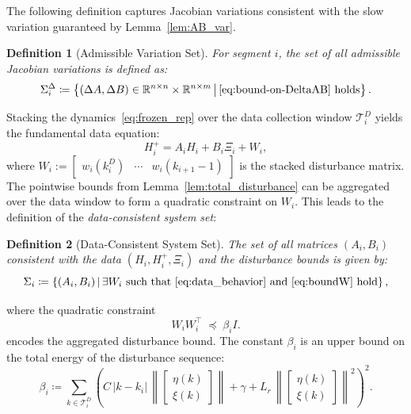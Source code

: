 \documentclass[letterpaper, 10 pt, conference]{ieeeconf}
\newtheorem{definition}{Definition}
\begin{document}
The following definition captures Jacobian variations consistent with the slow variation guaranteed by Lemma~\ref{lem:AB_var}.

\begin{definition}[Admissible Variation Set]\label{def:admissible_variation_set}
For segment $i$, the set of all admissible Jacobian variations is defined as:
\[
\Sigma_i^\Delta \coloneqq \left\{ (\Delta A, \Delta B) \in \mathbb{R}^{n \times n} \times \mathbb{R}^{n \times m} \, \middle| \, \eqref{eq:bound-on-DeltaAB} \text{ holds} \right\}.
\]
\end{definition}

Stacking the dynamics~\eqref{eq:frozen_rep} over the data collection window $\mathcal{T}_i^D$ yields the fundamental data equation:
\begin{equation}\label{eq:data_behavior}
H_i^{+} = A_i H_i + B_i \Xi_i + W_i,
\end{equation}
where $W_i := \begin{bmatrix} w_i(k_i^D) & \cdots & w_i(k_{i+1}-1) \end{bmatrix}$ is the stacked disturbance matrix. The pointwise bounds from Lemma~\ref{lem:total_disturbance} can be aggregated over the data window to form a quadratic constraint on $W_i$. This leads to the definition of the \emph{data-consistent system set}:

\begin{definition}[Data-Consistent System Set]\label{def:data_consistent_set}
The set of all matrices $(A_i, B_i)$ consistent with the data $(H_i, H_i^+, \Xi_i)$ and the disturbance bounds is given by:
\[
\Sigma_i \coloneqq \left\{ (A_i, B_i) \,\middle|\, \exists W_i \text{ such that } \eqref{eq:data_behavior} \text{ and } \eqref{eq:boundW} \text{ hold} \right\},
\]
\end{definition}
where the quadratic constraint
\begin{equation}\label{eq:boundW}
W_i W_i^\top \;\preceq\; \beta_i I.
\end{equation}
encodes the aggregated disturbance bound. The constant $\beta_i$ is an upper bound on the total energy of the disturbance sequence:
\begingroup
\setlength{\abovedisplayskip}{4pt}%
\setlength{\belowdisplayskip}{4pt}%
\begin{equation}\label{eq:beta_def}
\beta_i \coloneqq \sum_{k \in \mathcal{T}_i^D} \left( C\,|k - k_i| \, \left\| \begin{bmatrix} \eta(k) \\ \xi(k) \end{bmatrix} \right\| + \gamma + L_r \, \left\| \begin{bmatrix} \eta(k) \\ \xi(k) \end{bmatrix} \right\|^2 \right)^2.
\end{equation}
\endgroup
\end{document}
